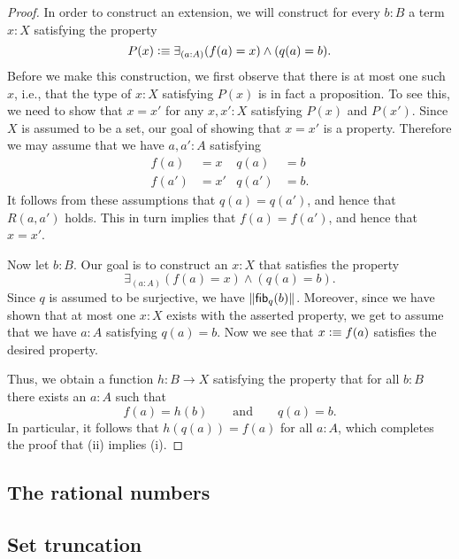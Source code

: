 \begin{proof}
  In order to construct an extension, we will construct for every $b:B$ a term $x:X$ satisfying the property
  \begin{equation*}
    P(x)\vcentcolon\equiv \exists_{(a:A)}(f(a)=x)\land (q(a)=b).
  \end{equation*}
  Before we make this construction, we first observe that there is at most one such $x$, i.e., that the type of $x:X$ satisfying $P(x)$ is in fact a proposition. To see this, we need to show that $x=x'$ for any $x,x':X$ satisfying $P(x)$ and $P(x')$. Since $X$ is assumed to be a set, our goal of showing that $x=x'$ is a property. Therefore we may assume that we have $a,a':A$ satisfying
  \begin{align*}
    f(a) & = x & q(a) & = b \\
    f(a') & = x' & q(a') & = b.
  \end{align*}
  It follows from these assumptions that $q(a)=q(a')$, and hence that $R(a,a')$ holds. This in turn implies that $f(a)=f(a')$, and hence that $x=x'$.

  Now let $b:B$. Our goal is to construct an $x:X$ that satisfies the property
  \begin{equation*}
    \exists_{(a:A)}(f(a)=x)\land (q(a)=b).
  \end{equation*}
  Since $q$ is assumed to be surjective, we have $\Vert \mathsf{fib}_{q}(b)\Vert_{}$. Moreover, since we have shown that at most one $x:X$ exists with the asserted property, we get to assume that we have $a:A$ satisfying $q(a)=b$. Now we see that $x\vcentcolon\equiv f(a)$ satisfies the desired property.

  Thus, we obtain a function $h:B\to X$ satisfying the property that for all $b:B$ there exists an $a:A$ such that
  \begin{equation*}
    f(a)=h(b)\qquad\text{and}\qquad q(a)=b.
  \end{equation*}
  In particular, it follows that $h(q(a))=f(a)$ for all $a:A$, which completes the proof that (ii) implies (i).  
\end{proof}

\subsection{The rational numbers}

\subsection{Set truncation}\label{sec:set-truncation}


